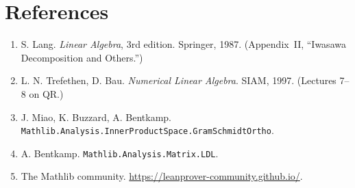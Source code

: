 \documentclass[11pt]{article}
\begin{document}
\section*{References}

\small
\begin{enumerate}[leftmargin=*, labelsep=0.4em, itemsep=0pt, topsep=0pt]
\item S. Lang. \emph{Linear Algebra}, 3rd edition. Springer, 1987.
(Appendix~II, ``Iwasawa Decomposition and Others.'')
\item L. N. Trefethen, D. Bau. \emph{Numerical Linear Algebra}. SIAM,
1997. (Lectures 7--8 on QR.)
\item J. Miao, K. Buzzard, A. Bentkamp.
\texttt{Mathlib.Analysis.InnerProductSpace.GramSchmidtOrtho}.
\item A. Bentkamp. \texttt{Mathlib.Analysis.Matrix.LDL}.
\item The Mathlib community. \url{https://leanprover-community.github.io/}.
\end{enumerate}
\end{document}
